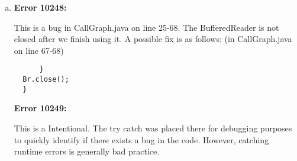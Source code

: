 \documentclass{article}
\begin{document}
\begin{enumerate}[(a)]
  \item
  \textbf{Error 10248:}
  
  This is a bug in CallGraph.java on line 25-68. The BufferedReader is not closed after we finish using it. A possible fix is as follows: (in CallGraph.java on line 67-68)

  \begin{lstlisting}
      }
  Br.close();
  }
  \end{lstlisting}

  \textbf{Error 10249:}

  This is a Intentional. The try catch was placed there for debugging purposes to quickly identify if there exists a bug in the code. However, catching runtime errors is generally bad practice. 
  \end{enumerate}
\end{document}
